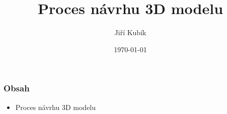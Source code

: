 \documentclass[aspectratio=169]{beamer}
\author{Jiří Kubík}
\title{Proces návrhu 3D modelu}
\date{\today}
\institute{%
\vspace{0.25em}
   {\bf \ps}\\ 
\vspace{0.25em}
   {\bf 2022}\\ 
\vspace{0.25em}
   {\GyBot}\\
\vspace{0.25em}
   {rev. 2022-10-1}
}
\begin{document}
    \begin{frame}
        \titlepage
    \end{frame}

    \begin{frame}[t]
        \frametitle{Obsah}
        \begin{itemize}
            \item Proces návrhu 3D modelu 
        \end{itemize}
    \end{frame}

    
    
    
\end{document}
